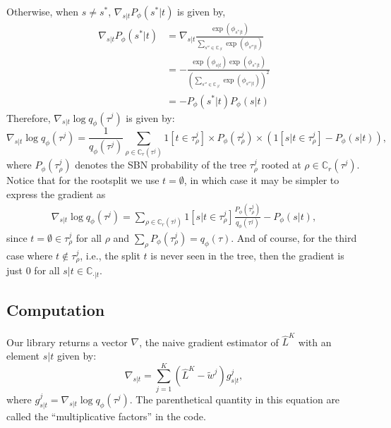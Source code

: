 \documentclass{article}
\begin{document}
Otherwise, when $s \not= s^*$, $\nabla_{s|t} P_{\phi}(s^*|t)$ is given by,
\begin{align*}
    \nabla_{s|t} P_{\phi}(s^*|t) &= \nabla_{s|t} \frac{\exp(\phi_{s^*|t})}{\sum\limits_{s'' \in \mathbb{C}_{.|t}} \exp(\phi_{s''|t})} \\
    &= - \frac{\exp(\phi_{s|t}) \exp(\phi_{s^*|t})}{\left(\sum\limits_{s'' \in \mathbb{C}_{.|t}} \exp(\phi_{s''|t})\right)^2} \\
    &= - P_{\phi}(s^*|t) P_{\phi}(s|t)
\end{align*}
Therefore, $\nabla_{s|t} \log q_{\phi}(\tau^j)$ is given by:
\begin{equation}
    \nabla_{s|t} \log q_{\phi}(\tau^j)
    = \frac{1}{q_{\phi}(\tau^j)} \sum\limits_{\rho \in \mathbb{C}_{r}(\tau^j)} 1[t \in \tau_{\rho}^j] \times P_{\phi}(\tau^j_{\rho}) \times \left(1[s|t \in \tau^j_{\rho}] - P_{\phi}(s|t)\right),
    \label{eq:gradLogQ}
\end{equation}
where $P_{\phi}(\tau_{\rho}^j)$ denotes the SBN probability of the tree $\tau^j_{\rho}$ rooted at $\rho \in \mathbb{C}_{r}(\tau^j)$.
Notice that for the rootsplit we use $t = \emptyset$, in which case it may be simpler to express the gradient as
\begin{align}
    \nabla_{s|t} \log q_{\phi}(\tau^j)
    = \sum\limits_{\rho \in \mathbb{C}_{r}(\tau^j)} 1[s|t \in \tau^j_{\rho}] \frac{P_{\phi}(\tau^j_{\rho})}{q_{\phi}(\tau^j)} - P_{\phi}(s|t),
    \label{eq:rootsplitGrad}
\end{align}
since $t = \emptyset \in \tau_{\rho}^j$ for all $\rho$ and $\sum_{\rho} P_{\phi}(\tau_{\rho}^j) = q_{\phi}(\tau)$.
And of course, for the third case where $t \notin \tau_{\rho}^j$, i.e., the split $t$ is never seen in the tree, then the gradient is just $0$ for all $s | t \in \mathbb{C}_{\cdot|t}$.


\subsection*{Computation}
Our library returns a vector $\nabla$, the naive gradient estimator of $\hat{L}^K$ with an element $s|t$ given by:
\begin{equation}\label{eq:nabla}
    \nabla_{s|t} = \sum\limits_{j=1}^{K} (\hat{L}^K - \tilde{w}^j) g_{s|t}^j,
\end{equation}
where $g_{s|t}^j = \nabla_{s|t} \log q_{\phi}(\tau^j)$.
The parenthetical quantity in this equation are called the ``multiplicative factors'' in the code.
\end{document}
